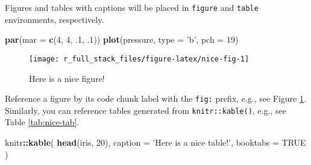 \documentclass[
]{book}
\newenvironment{Shaded}{\begin{snugshade}}{\end{snugshade}}
\newcommand{\DataTypeTok}[1]{\textcolor[rgb]{0.13,0.29,0.53}{#1}}
\newcommand{\DecValTok}[1]{\textcolor[rgb]{0.00,0.00,0.81}{#1}}
\newcommand{\FloatTok}[1]{\textcolor[rgb]{0.00,0.00,0.81}{#1}}
\newcommand{\KeywordTok}[1]{\textcolor[rgb]{0.13,0.29,0.53}{\textbf{#1}}}
\newcommand{\NormalTok}[1]{#1}
\newcommand{\OperatorTok}[1]{\textcolor[rgb]{0.81,0.36,0.00}{\textbf{#1}}}
\newcommand{\OtherTok}[1]{\textcolor[rgb]{0.56,0.35,0.01}{#1}}
\newcommand{\StringTok}[1]{\textcolor[rgb]{0.31,0.60,0.02}{#1}}
\begin{document}
Figures and tables with captions will be placed in \texttt{figure} and \texttt{table} environments, respectively.

\begin{Shaded}
\begin{Highlighting}[]
\KeywordTok{par}\NormalTok{(}\DataTypeTok{mar =} \KeywordTok{c}\NormalTok{(}\DecValTok{4}\NormalTok{, }\DecValTok{4}\NormalTok{, }\FloatTok{.1}\NormalTok{, }\FloatTok{.1}\NormalTok{))}
\KeywordTok{plot}\NormalTok{(pressure, }\DataTypeTok{type =} \StringTok{'b'}\NormalTok{, }\DataTypeTok{pch =} \DecValTok{19}\NormalTok{)}
\end{Highlighting}
\end{Shaded}

\begin{figure}

{\centering \texttt{[image: r\_full\_stack\_files/figure-latex/nice-fig-1]} 

}

\caption{Here is a nice figure!}\label{fig:nice-fig}
\end{figure}

Reference a figure by its code chunk label with the \texttt{fig:} prefix, e.g., see Figure \ref{fig:nice-fig}. Similarly, you can reference tables generated from \texttt{knitr::kable()}, e.g., see Table \ref{tab:nice-tab}.

\begin{Shaded}
\begin{Highlighting}[]
\NormalTok{knitr}\OperatorTok{::}\KeywordTok{kable}\NormalTok{(}
  \KeywordTok{head}\NormalTok{(iris, }\DecValTok{20}\NormalTok{), }\DataTypeTok{caption =} \StringTok{'Here is a nice table!'}\NormalTok{,}
  \DataTypeTok{booktabs =} \OtherTok{TRUE}
\NormalTok{)}
\end{Highlighting}
\end{Shaded}
\end{document}
